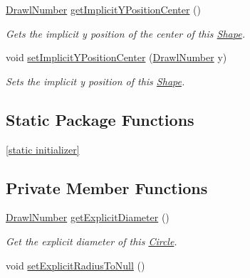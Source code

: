 \begin{DoxyCompactItemize}
\hyperlink{classcom_1_1aarrelaakso_1_1drawl_1_1_drawl_number}{Drawl\+Number} \hyperlink{classcom_1_1aarrelaakso_1_1drawl_1_1_shape_a0549739ee3201ae16091acce4ee6a5ac}{get\+Implicit\+Y\+Position\+Center} ()
\begin{DoxyCompactList}\small\item\em Gets the implicit y position of the center of this \hyperlink{classcom_1_1aarrelaakso_1_1drawl_1_1_shape}{Shape}. \end{DoxyCompactList}\item 
void \hyperlink{classcom_1_1aarrelaakso_1_1drawl_1_1_shape_ac49fa20747ea798a3b56c3ea99df2d8f}{set\+Implicit\+Y\+Position\+Center} (\hyperlink{classcom_1_1aarrelaakso_1_1drawl_1_1_drawl_number}{Drawl\+Number} y)
\begin{DoxyCompactList}\small\item\em Sets the implicit y position of this \hyperlink{classcom_1_1aarrelaakso_1_1drawl_1_1_shape}{Shape}. \end{DoxyCompactList}\end{DoxyCompactItemize}
\subsection*{Static Package Functions}
\begin{DoxyCompactItemize}
\item 
\hyperlink{classcom_1_1aarrelaakso_1_1drawl_1_1_shape_ad2adcb85374cf5d6d59429628314e8d1}{\mbox{[}static initializer\mbox{]}}
\end{DoxyCompactItemize}
\subsection*{Private Member Functions}
\begin{DoxyCompactItemize}
\item 
\hyperlink{classcom_1_1aarrelaakso_1_1drawl_1_1_drawl_number}{Drawl\+Number} \hyperlink{classcom_1_1aarrelaakso_1_1drawl_1_1_circle_ab1971c353febd9bc5f5633e9b6e5611e}{get\+Explicit\+Diameter} ()
\begin{DoxyCompactList}\small\item\em Get the explicit diameter of this \hyperlink{classcom_1_1aarrelaakso_1_1drawl_1_1_circle}{Circle}. \end{DoxyCompactList}\item 
void \hyperlink{classcom_1_1aarrelaakso_1_1drawl_1_1_circle_aff1c4d184a3234f987a95b673f91bf18}{set\+Explicit\+Radius\+To\+Null} ()
\end{DoxyCompactItemize}
